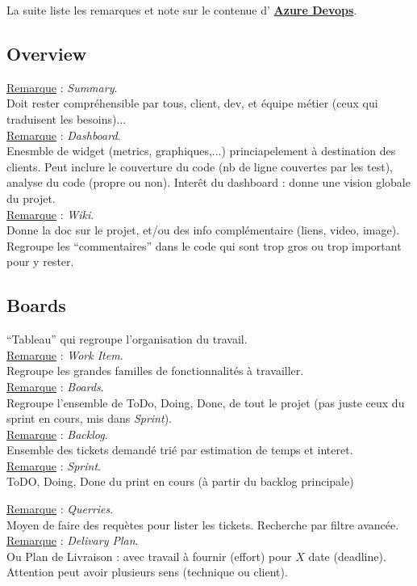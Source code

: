 \documentclass[a4paper,12pt,twoside]{article}
\newcommand{\urlcolor}{magenta}  %
\newcommand{\keycolor}{purple} %
\newcommand{\rem}[2]{\noindent\underline{Remarque} : \textit{#1}.\\ \indent #2}
\newcommand{\keyref}[2]{\hypersetup{urlcolor=\keycolor} \href{#1}{\textbf{#2}}\hypersetup{urlcolor=\urlcolor}}
\begin{document}
La suite liste les remarques et note sur le contenue d'\keyref{https://azure.microsoft.com/fr-fr/services/devops/#overview}{Azure Devops}.

\subsection{Overview}

\rem{Summary}{Doit rester compréhensible par tous, client, dev, et équipe métier (ceux qui traduisent les besoins)...}\\

\rem{Dashboard}{Enesmble de widget (metrics, graphiques,...) princiapelement à destination des clients. Peut inclure le couverture du code (nb de ligne couvertes par les test), analyse du code (propre ou non). Interêt du dashboard : donne une vision globale du projet.}\\

\rem{Wiki}{Donne la doc sur le projet, et/ou des info complémentaire (liens, video, image). Regroupe les ``commentaires'' dans le code qui sont trop gros ou trop important pour y rester.}\\

\subsection{Boards}

``Tableau'' qui regroupe l'organisation du travail.\\

\rem{Work Item}{Regroupe les grandes familles de fonctionnalités à travailler.}\\

\rem{Boards}{Regroupe l'ensemble de ToDo, Doing, Done, de tout le projet (pas juste ceux du sprint en cours, mis dans \textit{Sprint}).}\\

\rem{Backlog}{Ensemble des tickets demandé trié par estimation de temps et interet.}\\

\rem{Sprint}{ToDO, Doing, Done du print en cours (à partir du backlog principale)}

\rem{Querries}{Moyen de faire des requètes pour lister les tickets. Recherche par filtre avancée.}\\

\rem{Delivary Plan}{Ou Plan de Livraison : avec travail à fournir (effort) pour $X$ date (deadline). Attention peut avoir plusieurs sens (technique ou client). }\\
\end{document}

